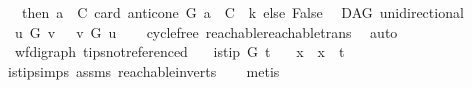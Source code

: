 \begin{isabellebody}
\ \ \ then\ {\isacharparenleft}{\kern0pt}{\isasymforall}a\ {\isasymin}\ C{\isachardot}{\kern0pt}\ card\ {\isacharparenleft}{\kern0pt}{\isacharparenleft}{\kern0pt}anticone\ G\ a{\isacharparenright}{\kern0pt}\ {\isasyminter}\ C{\isacharparenright}{\kern0pt}\ {\isasymle}\ k{\isacharparenright}{\kern0pt}\ else\ False{\isacharparenright}{\kern0pt}{\isachardoublequoteclose}%
\isadelimdocument
%
\endisadelimdocument
%
\isatagdocument
%
\isamarkuptrue%
%
\endisatagdocument
{\isafolddocument}%
%
\isadelimdocument
%
\endisadelimdocument
{}\isamarkupfalse%
\ {\isacharparenleft}{\kern0pt}\ DAG{\isacharparenright}{\kern0pt}\ unidirectional{\isacharcolon}{\kern0pt}\isanewline
\ \ {\isachardoublequoteopen}u\ {\isasymrightarrow}\isactrlsup {\isacharplus}{\kern0pt}\isactrlbsub G\isactrlesub \ v\ {\isasymlongrightarrow}\ {\isasymnot}{\isacharparenleft}{\kern0pt}\ v\ {\isasymrightarrow}\isactrlsup {\isacharasterisk}{\kern0pt}\isactrlbsub G\isactrlesub \ u{\isacharparenright}{\kern0pt}{\isachardoublequoteclose}\isanewline
%
\isadelimproof
\ \ %
\endisadelimproof
%
\isatagproof
{}\isamarkupfalse%
\ cycle{\isacharunderscore}{\kern0pt}free\ reachable{}{\isacharunderscore}{\kern0pt}reachable{\isacharunderscore}{\kern0pt}trans\ \isamarkupfalse%
\ auto%
\endisatagproof
{\isafoldproof}%
%
\isadelimproof
%
\endisadelimproof
%
\isadelimdocument
%
\endisadelimdocument
%
\isatagdocument
%
\isamarkuptrue%
%
\endisatagdocument
{\isafolddocument}%
%
\isadelimdocument
%
\endisadelimdocument
{}\isamarkupfalse%
\ {\isacharparenleft}{\kern0pt}\ wf{\isacharunderscore}{\kern0pt}digraph{\isacharparenright}{\kern0pt}\ tips{\isacharunderscore}{\kern0pt}not{\isacharunderscore}{\kern0pt}referenced{\isacharcolon}{\kern0pt}\isanewline
\ \ \ {\isachardoublequoteopen}is{\isacharunderscore}{\kern0pt}tip\ G\ t{\isachardoublequoteclose}\isanewline
\ \ \ {\isachardoublequoteopen}{\isasymforall}x{\isachardot}{\kern0pt}\ {\isasymnot}\ x\ {\isasymrightarrow}\isactrlsup {\isacharplus}{\kern0pt}\ t{\isachardoublequoteclose}\isanewline
%
\isadelimproof
\ \ %
\endisadelimproof
%
\isatagproof
{}\isamarkupfalse%
\ is{\isacharunderscore}{\kern0pt}tip{\isachardot}{\kern0pt}simps\ assms\ reachable{}{\isacharunderscore}{\kern0pt}in{\isacharunderscore}{\kern0pt}verts{\isacharparenleft}{\kern0pt}{}{\isacharparenright}{\kern0pt}\isanewline
\ \ \isamarkupfalse%
\ metis%

\end{isabellebody}
